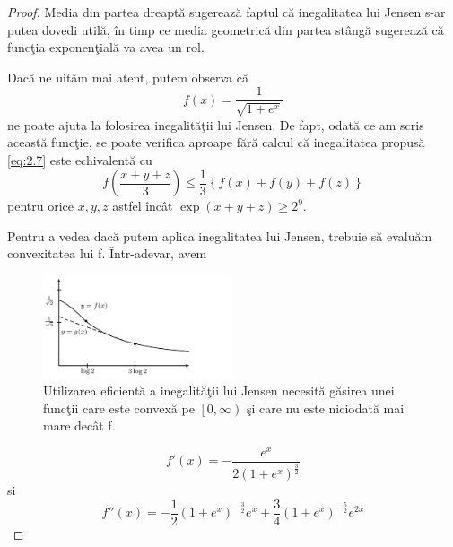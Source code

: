 \documentclass[a4paper,12pt,oneside]{report}
\begin{document}
\begin{proof}
Media din partea dreapt\u{a} sugereaz\u{a} faptul c\u{a} inegalitatea lui Jensen s-ar putea dovedi util\u{a}, \^{i}n timp ce media geometric\u{a} din partea st\^{a}ng\u{a} sugereaz\u{a} c\u{a} func\c{t}ia exponen\c{t}ial\u{a} va avea un rol.

Dac\u{a} ne uit\u{a}m mai atent, putem observa c\u{a}
\begin{displaymath}
  f\left ( x \right ) = \frac{1}{\sqrt{1+ e^{x}}}
\end{displaymath}
ne poate ajuta la folosirea inegalit\u{a}\c{t}ii lui Jensen. De fapt, odat\u{a} ce am scris aceast\u{a} func\c{t}ie, se poate verifica aproape f\u{a}r\u{a} calcul c\u{a} inegalitatea propus\u{a} \ref{eq:2.7} este echivalent\u{a} cu
\begin{displaymath}
  f\left ( \frac{x + y + z}{3} \right )\leq \frac{1}{3}\left \{ f\left ( x \right ) + f\left ( y \right ) + f\left ( z \right ) \right \}    \label{eq:2.8} \tag{2.8}
\end{displaymath}
pentru orice $x, y, z$ astfel \^{i}nc\^{a}t \(\exp\left ( x + y + z \right )\geq 2^{9}.\)

Pentru a vedea dac\u{a} putem aplica inegalitatea lui Jensen, trebuie s\u{a} evalu\u{a}m convexitatea lui f. \^{I}ntr-adevar, avem

\begin{figure}[htbp]
	\centering
	\includegraphics[width=0.5\textwidth]{fig_pb3.png}
	\caption{ Utilizarea eficient\u{a} a inegalit\u{a}\c{t}ii lui Jensen necesit\u{a} g\u{a}sirea unei func\c{t}ii care este convex\u{a} pe \(\left [ 0, \infty  \right )\)  \c{s}i care nu este niciodat\u{a} mai mare dec\^{a}t f.}
\end{figure}

\begin{displaymath}
  {f}'\left ( x \right ) = -\frac{e^{x}}{2 \left ( 1 + e^{x} \right )^{\frac{3}{2}}}
\end{displaymath}
si
\begin{displaymath}
  {f}''\left ( x \right ) = -\frac{1}{2}\left (  1 + e^{x} \right )^{-\frac{3}{2}}e^{x} + \frac{3}{4}\left ( 1 + e^{x} \right )^{-\frac{5}{2}}e^{2x}
\end{displaymath}


\end{proof}
\end{document}
